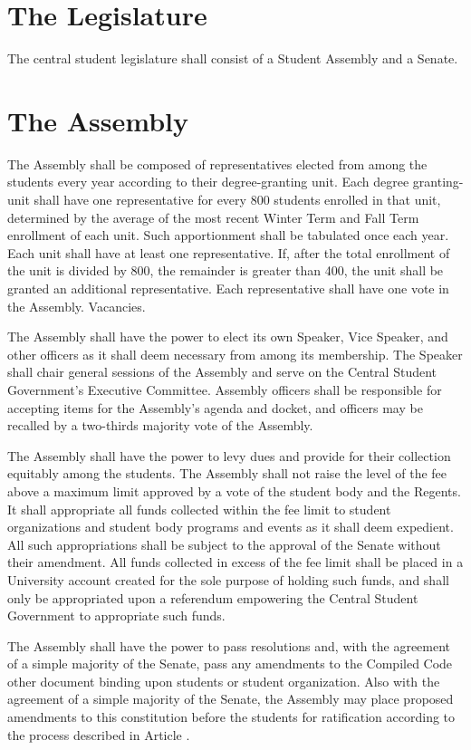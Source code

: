 
\section{The Legislature}
    The central student legislature shall consist of a Student Assembly and a Senate.


\section{The Assembly}
    The Assembly shall be composed of representatives elected from among the students every year according to their degree-granting unit. Each degree granting-unit shall have one representative for every 800 students enrolled in that unit, determined by the average of the most recent Winter Term and Fall Term enrollment of each unit. Such apportionment shall be tabulated once each year. Each unit shall have at least one representative. If, after the total enrollment of the unit is divided by 800, the remainder is greater than 400, the unit shall be granted an additional representative. Each representative shall have one vote in the Assembly. Vacancies.

    The Assembly shall have the power to elect its own Speaker, Vice Speaker, and other officers as it shall deem necessary from among its membership. The Speaker shall chair general sessions of the Assembly and serve on the Central Student Government's Executive Committee. Assembly officers shall be responsible for accepting items for the Assembly's agenda and docket, and officers may be recalled by a two-thirds majority vote of the Assembly.

     The Assembly shall have the power to levy dues and provide for their collection equitably among the students. The Assembly shall not raise the level of the fee above a maximum limit approved by a vote of the student body and the Regents. It shall appropriate all funds collected within the fee limit to student organizations and student body programs and events as it shall deem expedient. All such appropriations shall be subject to the approval of the Senate without their amendment. All funds collected in excess of the fee limit shall be placed in a University account created for the sole purpose of holding such funds, and shall only be appropriated upon a referendum empowering the Central Student Government to appropriate such funds.

    The Assembly shall have the power to pass resolutions and, with the agreement of a simple majority of the Senate, pass any amendments to the Compiled Code other document binding upon students or student organization. Also with the agreement of a simple majority of the Senate, the Assembly may place proposed amendments to this constitution before the students for ratification according to the process described in Article .

